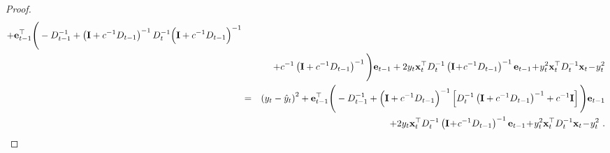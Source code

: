 \begin{proof}
\begin{eqnarray*}
+\veti{t-1}
\Bigg(-D_{t-1}^{-1}
+\left(\mi+c^{-1}D_{t-1}\right)^{-1}
 D_{t}^{-1}
\Big(\mi +c^{-1}D_{t-1}
\Big)^{-1}\\
&&+c^{-1}\left(\mi+c^{-1}D_{t-1}\right)^{-1}
\Bigg)
 \vei{t-1}+2y_{t}\vxti{t}D_{t}^{-1}\left(\mi\!+\!c^{-1}D_{t-1}\right)^{-1}\vei{t-1} \!+\!y_{t}^{2}\vxti{t}D_{t}^{-1}\vxi{t}\!-\!y_{t}^{2}\\
 &  =&
 \left(y_{t}-\hat{y}_{t}\right)^{2}+\veti{t-1}
\Bigg(-D_{t-1}^{-1}+
\Big(\mi\vphantom{\left[D_{t}^{-1}\left(\mi+c^{-1}D_{t-1}\right)^{-1}+c^{-1}\mi\right]}
+c^{-1}D_{t-1}
\Big)^{-1}
\left[D_{t}^{-1}\left(\mi+c^{-1}D_{t-1}\right)^{-1}+c^{-1}\mi\right]
\Bigg)\vei{t-1}\\
 &  & +2y_{t}\vxti{t}D_{t}^{-1}\left(\mi\!+\!c^{-1}D_{t-1}\right)^{-1}\vei{t-1}\!+\!y_{t}^{2}\vxti{t}D_{t}^{-1}\vxi{t}\!-\!y_{t}^{2}~.
\end{eqnarray*}

\end{proof}

